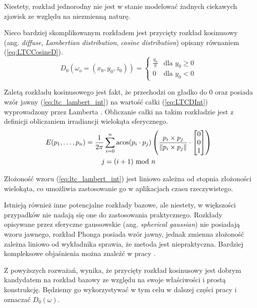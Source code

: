 \documentclass[../main.tex]{subfiles}
\begin{document}
Niestety, rozkład jednorodny nie jest w stanie modelować żadnych ciekawych zjawisk ze względu na niezmienną naturę.

Nieco bardziej skomplikowanym rozkładem jest przycięty rozkład kosinusowy (ang. \textit{diffuse}, \textit{Lambertian distribution}, \textit{cosine distribution}) opisany równaniem (\ref{eq:LTCCosineD}).
\begin{equation}
D_0(\omega_o=(x_0, y_0, z_0)) = \begin{cases}
  \frac{y_0}{\pi} & \text{dla } y_0 \geq 0 \\
  0 & \text{dla } y_0 < 0
\end{cases}
\label{eq:LTCCosineD}
\end{equation}

Zaletą rozkładu kosinusowego jest fakt, że przechodzi on gładko do $0$ oraz posiada wzór jawny (\ref{eq:ltc_lambert_int}) na wartość całki (\ref{eq:LTCDInt}) wyprowadzony przez Lamberta \cite{Baum}. Obliczanie całki na takim rozkładzie jest z definicji obliczaniem irradiancji wielokąta sferycznego.
\begin{equation}
\begin{gathered}
E(p_1, \ldots, p_n) =
\frac{1}{2\pi}
\sum_{i=0}^{n} {
  \acos(p_i \cdot p_j)
  \left( {
    \frac{p_i \times p_j}{\norm{p_i \times p_j}}
    \cdot
    \left[ \begin{matrix} 0 \\ 0 \\ 1 \end{matrix} \right]
  } \right)
} \\
j = (i+1) \text{ mod } n
\end{gathered}
\label{eq:ltc_lambert_int}
\end{equation}

Złożoność wzoru (\ref{eq:ltc_lambert_int}) jest liniowo zależna od stopnia złożoności wielokąta, co umożliwia zastosowanie go w aplikacjach czasu rzeczywistego.

Istnieją również inne potencjalne rozkłady bazowe, ale niestety, w większości przypadków nie nadają się one do zastosowania praktycznego. Rozkłady opisywane przez sferyczne gaussowskie (ang. \textit{spherical gaussian}) nie posiadają wzoru jawnego, rozkład Phonga posiada wzór jawny, jednak zmienna złożoność zależna liniowo od wykładnika sprawia, że metoda jest niepraktyczna. Bardziej kompleksowe objaśnienia można znaleźć w pracy \cite{ltc_heitz}.

Z powyższych rozważań, wynika, że przycięty rozkład kosinusowy jest dobrym kandydatem na rozkład bazowy ze względu na swoje właściwości i prostą konstrukcję. Będziemy go wykorzystywać w tym celu w dalszej części pracy i oznaczać $D_0(\omega)$.
\end{document}
